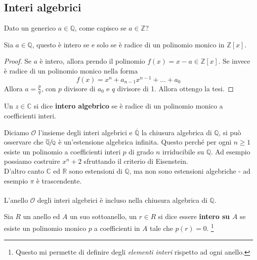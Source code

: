 \subsection{Interi algebrici}
\label{lezione17}
Dato un generico $a\in\mathbb{Q}$, come capisco se $a\in\mathbb{Z}$?
\begin{proposizione}
	Sia $a\in\mathbb{Q}$, questo è intero se e solo se è radice di un polinomio monico in $\mathbb{Z}[x]$.
\end{proposizione}
\begin{proof}
	Se $a$ è intero, allora prendo il polinomio $f(x)=x-a\in\mathbb{Z}[x]$. Se invece è radice di un polinomio monico nella forma
	\begin{equation*}
	f(x)=x^n+a_{n-1}x^{n-1}+\dots+a_0
	\end{equation*}
	Allora $a=\frac{p}{q}$, con $p$ divisore di $a_0$ e $q$ divisore di 1. Allora ottengo la tesi.
\end{proof}
\begin{definizione}
	Un $z\in\mathbb{C}$ si dice \textbf{intero algebrico} se è radice di un polinomio monico a coefficienti interi.
\end{definizione}
\begin{osservazione}
	Diciamo $\mathcal{O}$ l'insieme degli interi algebrici e $\overline{\mathbb{Q}}$ la chiusura algebrica di $\mathbb{Q}$, si può osservare che $\sfrac{\overline{\mathbb{Q}}}{\mathbb{Q}}$ è un'estensione algebrica infinita. Questo perché per ogni $n\geq1$ esiste un polinomio a coefficienti interi $p$ di grado $n$ irriducibile su $\mathbb{Q}$. Ad esempio possiamo costruire $x^n+2$ sfruttando il criterio di Eisenstein. \\ D'altro canto $\mathbb{C}$ ed $\mathbb{R}$ sono estensioni di $\mathbb{Q}$, ma non sono estensioni algebriche - ad esempio $\pi$ è trascendente. \\ \\ L'anello $\mathcal{O}$ degli interi algebrici è incluso nella chiusura algebrica di $\mathbb{Q}$.
\end{osservazione}
\begin{definizione}
	Sia $R$ un anello ed $A$ un suo sottoanello, un $r\in R$ si dice essere \textbf{intero su $A$} se esiste un polinomio monico $p$ a coefficienti in $A$ tale che $p(r)=0$. \footnote{Questo mi permette di definire degli \textit{elementi interi} rispetto ad ogni anello.}
\end{definizione}
